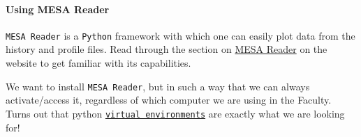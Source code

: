 \documentclass[11pt,a4paper]{article}
\begin{document}
\paragraph{Using MESA Reader}
\texttt{MESA Reader} is a \texttt{Python} framework with which one can easily plot data from the history and profile files. Read through the section on \href{https://docs.mesastar.org/en/latest/using_mesa/output.html#plotting-mesa-output}{MESA Reader} on the website to get familiar with its capabilities. 

We want to install \texttt{MESA Reader}, but in such a way that we can always activate/access it, regardless of which computer we are using in the Faculty. 
Turns out that python \href{https://virtualenv.pypa.io/en/latest/user_guide.html}{\texttt{virtual environments}} are exactly what we are looking for!
\end{document}
